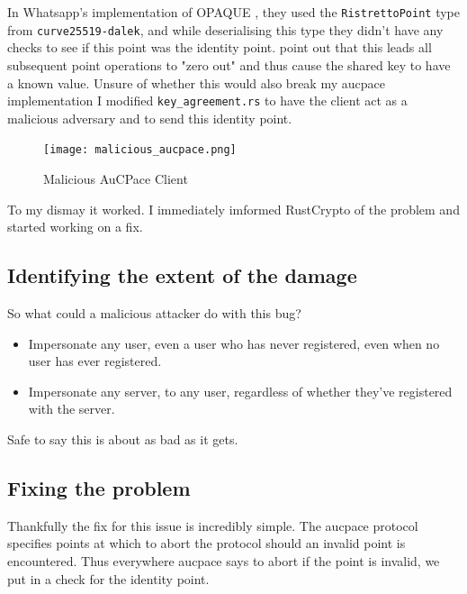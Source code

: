 In Whatsapp's implementation of OPAQUE \cite{opaque}, they used the \texttt{RistrettoPoint} type from \texttt{curve25519-dalek}, and while deserialising this type they didn't have any checks to see if this point was the identity point.
 point out that this leads all subsequent point operations to "zero out" and thus cause the shared key to have a known value.
Unsure of whether this would also break my \gls{aucpace} implementation I modified \texttt{key\_agreement.rs} to have the client act as a malicious adversary and to send this identity point.


\begin{figure}[H]
  \centering

  \texttt{[image: malicious\_aucpace.png]}
  \caption{Malicious AuCPace Client}
  \label{fig:break-everything}
\end{figure}

To my dismay it worked.
I immediately imformed RustCrypto of the problem and started working on a fix.

\subsection{Identifying the extent of the damage}
So what could a malicious attacker do with this bug?

\begin{itemize}
  \item{Impersonate any user, even a user who has never registered, even when no user has ever registered.}
  \item{Impersonate any server, to any user, regardless of whether they've registered with the server.}
\end{itemize}

Safe to say this is about as bad as it gets.

\subsection{Fixing the problem}
Thankfully the fix for this issue is incredibly simple.
The \gls{aucpace} protocol specifies points at which to abort the protocol should an invalid point is encountered.
Thus everywhere \gls{aucpace} says to abort if the point is invalid, we put in a check for the identity point.


